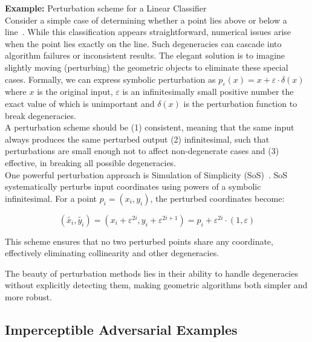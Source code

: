 \documentclass[a4paper, oneside]{discothesis}
\begin{document}
\begin{highlightbox}
	\textbf{Example:} Perturbation scheme for a Linear Classifier \\

	Consider a simple case of determining whether a point lies above or below a line~\cite{de2000computational}. While this classification appears straightforward, numerical issues arise when the point lies exactly on the line. Such degeneracies can cascade into algorithm failures or inconsistent results. The elegant solution is to imagine slightly moving (perturbing) the geometric objects to eliminate these special cases. Formally, we can express symbolic perturbation as $p_\varepsilon(x) = x + \varepsilon \cdot \delta(x)$ where $x$ is the original input, $\varepsilon$ is an infinitesimally small positive number the exact value of which is unimportant and $\delta(x)$ is the perturbation function to break degeneracies. \\

	A perturbation scheme should be (1) consistent, meaning that the same input always produces the same perturbed output (2) infinitesimal, such that perturbations are small enough not to affect non-degenerate cases and (3) effective, in breaking all possible degeneracies. \\

	One powerful perturbation approach is Simulation of Simplicity (SoS)~\cite{franklin2022implementing, edelsbrunner2002topological, edelsbrunner2001sink, edelsbrunner1990simulation, levy2016robustness, schorn1993axiomatic}. SoS systematically perturbs input coordinates using powers of a symbolic infinitesimal. For a point $p_i = (x_i, y_i)$, the perturbed coordinates become:

	$$(\tilde{x_i}, \tilde{y_i}) = (x_i + \varepsilon^{2i}, y_i + \varepsilon^{2i+1}) = p_i + \varepsilon^{2i} \cdot (1, \varepsilon)$$

	This scheme ensures that no two perturbed points share any coordinate, effectively eliminating collinearity and other degeneracies.
\end{highlightbox}

The beauty of perturbation methods lies in their ability to handle degeneracies without explicitly detecting them, making geometric algorithms both simpler and more robust.

\subsection{Imperceptible Adversarial Examples}
\end{document}
